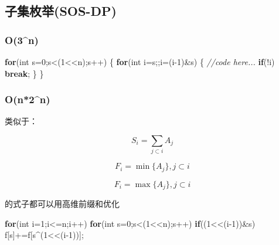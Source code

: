 \documentclass[
]{article}
\newenvironment{Shaded}{}{}
\newcommand{\CommentTok}[1]{\textcolor[rgb]{0.38,0.63,0.69}{\textit{#1}}}
\newcommand{\ControlFlowTok}[1]{\textcolor[rgb]{0.00,0.44,0.13}{\textbf{#1}}}
\newcommand{\DataTypeTok}[1]{\textcolor[rgb]{0.56,0.13,0.00}{#1}}
\newcommand{\DecValTok}[1]{\textcolor[rgb]{0.25,0.63,0.44}{#1}}
\newcommand{\NormalTok}[1]{#1}
\begin{document}
\hypertarget{ux5b50ux96c6ux679aux4e3esos-dp}{%
\subsection{子集枚举(SOS-DP)}\label{ux5b50ux96c6ux679aux4e3esos-dp}}

\hypertarget{o3n}{%
\subsubsection{O(3\^{}n)}\label{o3n}}

\begin{Shaded}
\begin{Highlighting}[]
\ControlFlowTok{for}\NormalTok{(}\DataTypeTok{int}\NormalTok{ s=}\DecValTok{0}\NormalTok{;s\textless{}(}\DecValTok{1}\NormalTok{\textless{}\textless{}n);s++)}
\NormalTok{\{}
    \ControlFlowTok{for}\NormalTok{(}\DataTypeTok{int}\NormalTok{ i=s;;i=(i{-}}\DecValTok{1}\NormalTok{)\&s)}
\NormalTok{    \{}
        \CommentTok{//code here...}
        \ControlFlowTok{if}\NormalTok{(!i) }\ControlFlowTok{break}\NormalTok{;}
\NormalTok{    \}}
\NormalTok{\}}
\end{Highlighting}
\end{Shaded}

\hypertarget{on2n}{%
\subsubsection{O(n*2\^{}n)}\label{on2n}}

类似于：

\[S_i = \sum_{j\subset i}A_j\]

\[F_i = \min_{}\{A_j\},  j\subset i\]

\[F_i = \max_{}\{A_j\},  j\subset i\]

的式子都可以用高维前缀和优化

\begin{Shaded}
\begin{Highlighting}[]
\ControlFlowTok{for}\NormalTok{(}\DataTypeTok{int}\NormalTok{ i=}\DecValTok{1}\NormalTok{;i\textless{}=n;i++)}
    \ControlFlowTok{for}\NormalTok{(}\DataTypeTok{int}\NormalTok{ s=}\DecValTok{0}\NormalTok{;s\textless{}(}\DecValTok{1}\NormalTok{\textless{}\textless{}n);s++)}
        \ControlFlowTok{if}\NormalTok{((}\DecValTok{1}\NormalTok{\textless{}\textless{}(i{-}}\DecValTok{1}\NormalTok{))\&s)}
\NormalTok{            f[s]+=f[s\^{}(}\DecValTok{1}\NormalTok{\textless{}\textless{}(i{-}}\DecValTok{1}\NormalTok{))];}
\end{Highlighting}
\end{Shaded}
\end{document}
